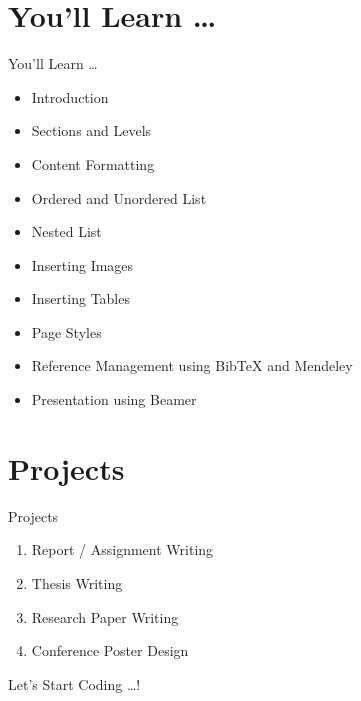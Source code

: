 \documentclass[dvipsnames, aspectratio=169]{beamer}
\begin{document}
	\section{You'll Learn \dots}
	\begin{frame}[t]{You'll Learn \dots} \vspace{10pt}
		\begin{itemize}
			\item Introduction
			\item Sections and Levels 
			\item Content Formatting
			\item Ordered and Unordered List 
			\item Nested List 
			\item Inserting Images 
			\item Inserting Tables 
			\item Page Styles 
			\item Reference Management using BibTeX and Mendeley 
			\item Presentation using Beamer 
		\end{itemize}
	\end{frame}

	\section{Projects}
	\begin{frame}[t]{Projects}\vspace{10pt}
	\begin{enumerate}
		\item Report / Assignment Writing 
		\item Thesis Writing
		\item Research Paper  Writing
		\item Conference Poster Design 
	
	\end{enumerate}
	\end{frame}
	
	
	\begin{frame}
		\centering \LARGE Let's Start Coding \dots!
	\end{frame}
	
\end{document}
